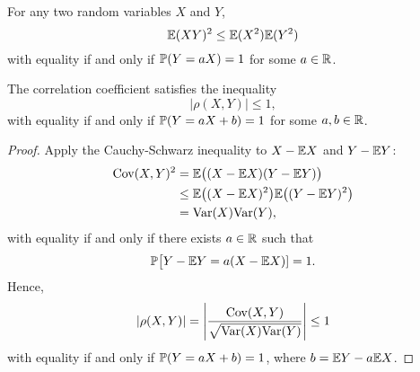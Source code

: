 \begin{theorem}
For any two random variables $X$ and $Y$,
\[
\mathbb{E}(XY)^2 \leq \mathbb{E}(X^2)\mathbb{E}(Y^2)
\]
with equality if and only if $\mathbb{P}(Y=aX)=1$ for some $a\in\mathbb{R}$.
\end{theorem}


\begin{theorem}\label{thm:bounds_on_rho}
The correlation coefficient satisfies the inequality 
\[
|\rho(X,Y)|\leq 1,
\]
with equality if and only if $\mathbb{P}(Y=aX+b)=1$ for some $a,b\in\mathbb{R}$.
\end{theorem}
\begin{proof}
Apply the Cauchy-Schwarz inequality to $X-\mathbb{E} X$ and $Y-\mathbb{E} Y$:
\begin{align*}
\text{Cov}(X,Y)^2 
	& =		\mathbb{E}\big((X-\mathbb{E} X)(Y-\mathbb{E} Y)\big) \\
	& \leq 	\mathbb{E}\big((X-\mathbb{E} X)^2\big)\mathbb{E}\big((Y-\mathbb{E} Y)^2\big) \\
	& = 	\text{Var}(X)\text{Var}(Y),
\end{align*}
with equality if and only if there exists $a\in\mathbb{R}$ such that
\[
\mathbb{P}\big[Y-\mathbb{E} Y = a(X-\mathbb{E} X)] = 1.
\]
Hence,
\[	
|\rho(X,Y)| = \left|\frac{\text{Cov}(X,Y)}{\sqrt{\text{Var}(X)\text{Var}(Y)}}\right| \leq 1
\]
with equality if and only if $\mathbb{P}(Y = aX + b) = 1$,  where $b = \mathbb{E} Y - a\mathbb{E} X$.
\end{proof}

